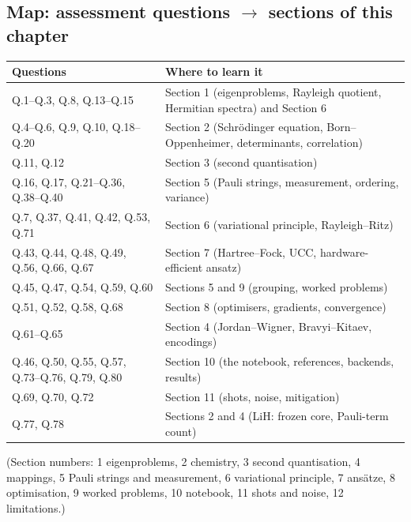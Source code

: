 \documentclass[11pt,a4paper,openany]{book}
\begin{document}
\subsection{Map: assessment questions $\to$ sections of this chapter}
\begin{tabularx}{\linewidth}{@{}lX@{}}
\toprule
\textbf{Questions} & \textbf{Where to learn it}\\ \midrule
Q.1--Q.3, Q.8, Q.13--Q.15 & Section 1 (eigenproblems, Rayleigh quotient, Hermitian spectra) and Section 6\\
Q.4--Q.6, Q.9, Q.10, Q.18--Q.20 & Section 2 (Schr\"odinger equation, Born--Oppenheimer, determinants, correlation)\\
Q.11, Q.12 & Section 3 (second quantisation)\\
Q.16, Q.17, Q.21--Q.36, Q.38--Q.40 & Section 5 (Pauli strings, measurement, ordering, variance)\\
Q.7, Q.37, Q.41, Q.42, Q.53, Q.71 & Section 6 (variational principle, Rayleigh--Ritz)\\
Q.43, Q.44, Q.48, Q.49, Q.56, Q.66, Q.67 & Section 7 (Hartree--Fock, UCC, hardware-efficient ansatz)\\
Q.45, Q.47, Q.54, Q.59, Q.60 & Sections 5 and 9 (grouping, worked problems)\\
Q.51, Q.52, Q.58, Q.68 & Section 8 (optimisers, gradients, convergence)\\
Q.61--Q.65 & Section 4 (Jordan--Wigner, Bravyi--Kitaev, encodings)\\
Q.46, Q.50, Q.55, Q.57, Q.73--Q.76, Q.79, Q.80 & Section 10 (the notebook, references, backends, results)\\
Q.69, Q.70, Q.72 & Section 11 (shots, noise, mitigation)\\
Q.77, Q.78 & Sections 2 and 4 (LiH: frozen core, Pauli-term count)\\
\bottomrule
\end{tabularx}
{\small (Section numbers: 1 eigenproblems, 2 chemistry, 3 second quantisation, 4 mappings, 5 Pauli strings and measurement, 6 variational
principle, 7 ansätze, 8 optimisation, 9 worked problems, 10 notebook, 11 shots and noise, 12 limitations.)}

\end{document}

